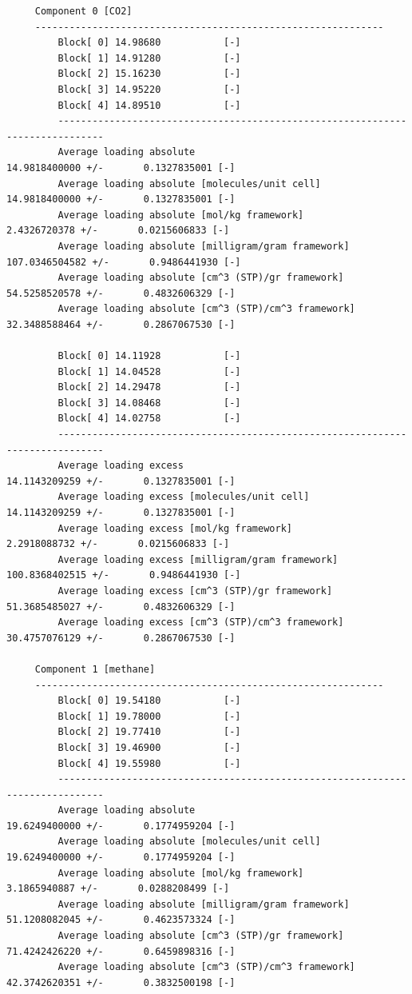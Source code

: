 \begin{tiny}
\begin{verbatim}
     Component 0 [CO2]
     -------------------------------------------------------------
         Block[ 0] 14.98680           [-]
         Block[ 1] 14.91280           [-]
         Block[ 2] 15.16230           [-]
         Block[ 3] 14.95220           [-]
         Block[ 4] 14.89510           [-]
         ------------------------------------------------------------------------------
         Average loading absolute                             14.9818400000 +/-       0.1327835001 [-]
         Average loading absolute [molecules/unit cell]       14.9818400000 +/-       0.1327835001 [-]
         Average loading absolute [mol/kg framework]                  2.4326720378 +/-       0.0215606833 [-]
         Average loading absolute [milligram/gram framework]        107.0346504582 +/-       0.9486441930 [-]
         Average loading absolute [cm^3 (STP)/gr framework]          54.5258520578 +/-       0.4832606329 [-]
         Average loading absolute [cm^3 (STP)/cm^3 framework]        32.3488588464 +/-       0.2867067530 [-]
     
         Block[ 0] 14.11928           [-]
         Block[ 1] 14.04528           [-]
         Block[ 2] 14.29478           [-]
         Block[ 3] 14.08468           [-]
         Block[ 4] 14.02758           [-]
         ------------------------------------------------------------------------------
         Average loading excess                             14.1143209259 +/-       0.1327835001 [-]
         Average loading excess [molecules/unit cell]       14.1143209259 +/-       0.1327835001 [-]
         Average loading excess [mol/kg framework]                    2.2918088732 +/-       0.0215606833 [-]
         Average loading excess [milligram/gram framework]          100.8368402515 +/-       0.9486441930 [-]
         Average loading excess [cm^3 (STP)/gr framework]            51.3685485027 +/-       0.4832606329 [-]
         Average loading excess [cm^3 (STP)/cm^3 framework]          30.4757076129 +/-       0.2867067530 [-]
     
     Component 1 [methane]
     -------------------------------------------------------------
         Block[ 0] 19.54180           [-]
         Block[ 1] 19.78000           [-]
         Block[ 2] 19.77410           [-]
         Block[ 3] 19.46900           [-]
         Block[ 4] 19.55980           [-]
         ------------------------------------------------------------------------------
         Average loading absolute                             19.6249400000 +/-       0.1774959204 [-]
         Average loading absolute [molecules/unit cell]       19.6249400000 +/-       0.1774959204 [-]
         Average loading absolute [mol/kg framework]                  3.1865940887 +/-       0.0288208499 [-]
         Average loading absolute [milligram/gram framework]         51.1208082045 +/-       0.4623573324 [-]
         Average loading absolute [cm^3 (STP)/gr framework]          71.4242426220 +/-       0.6459898316 [-]
         Average loading absolute [cm^3 (STP)/cm^3 framework]        42.3742620351 +/-       0.3832500198 [-]
     

\end{verbatim}
\end{tiny}

